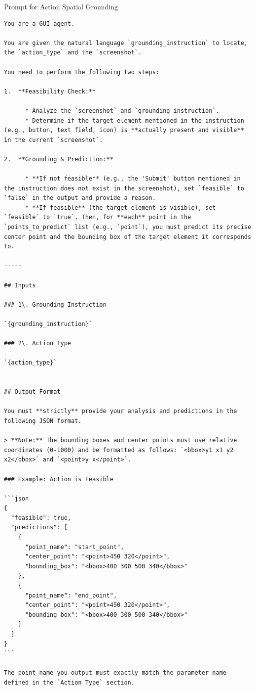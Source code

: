 \documentclass{article}
\theoremstyle{plain}
\theoremstyle{definition}
\theoremstyle{remark}
\begin{document}
\begin{promptbox}{Prompt for Action Spatial Grounding}
\begin{lstlisting}
You are a GUI agent.

You are given the natural language `grounding_instruction` to locate, the `action_type` and the `screenshot`. 

You need to perform the following two steps:

1.  **Feasibility Check:**

      * Analyze the `screenshot` and `grounding_instruction`.
      * Determine if the target element mentioned in the instruction (e.g., button, text field, icon) is **actually present and visible** in the current `screenshot`.

2.  **Grounding & Prediction:**

      * **If not feasible** (e.g., the 'Submit' button mentioned in the instruction does not exist in the screenshot), set `feasible` to `false` in the output and provide a reason.
      * **If feasible** (the target element is visible), set `feasible` to `true`. Then, for **each** point in the `points_to_predict` list (e.g., `point`), you must predict its precise center point and the bounding box of the target element it corresponds to.

-----

## Inputs

### 1\. Grounding Instruction

`{grounding_instruction}`

### 2\. Action Type

`{action_type}`


## Output Format

You must **strictly** provide your analysis and predictions in the following JSON format.

> **Note:** The bounding boxes and center points must use relative coordinates (0-1000) and be formatted as follows: `<bbox>y1 x1 y2 x2</bbox>` and `<point>y x</point>`.

### Example: Action is Feasible

```json
{
  "feasible": true,
  "predictions": [
    {
      "point_name": "start_point",
      "center_point": "<point>450 320</point>",
      "bounding_box": "<bbox>400 300 500 340</bbox>"
    },
    {
      "point_name": "end_point",
      "center_point": "<point>450 320</point>",
      "bounding_box": "<bbox>400 300 500 340</bbox>"
    }
  ]
}
```

The point_name you output must exactly match the parameter name defined in the `Action Type` section.


\end{lstlisting}
\end{promptbox}
\end{document}
